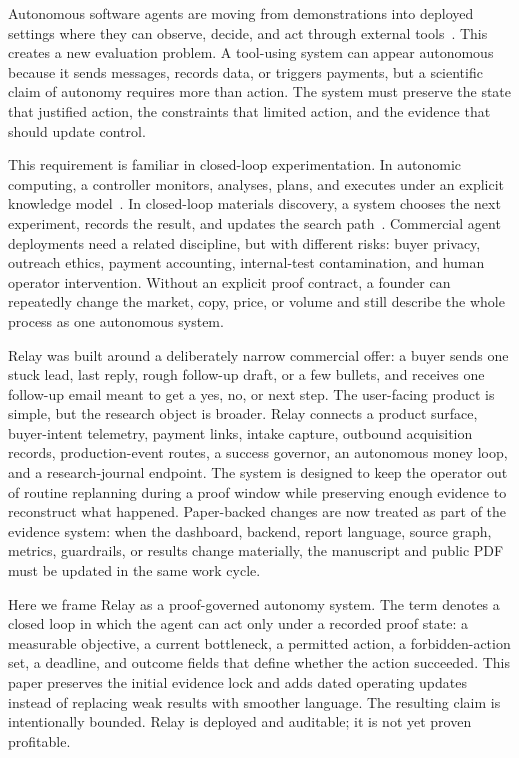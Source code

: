 \documentclass[12pt,letterpaper]{article}
\begin{document}
Autonomous software agents are moving from demonstrations into deployed settings where they can observe, decide, and act through external tools~\cite{yao_react_2023,schick_toolformer_2023,park_generative_2023,wu_autogen_2023,wang_survey_2023}. This creates a new evaluation problem. A tool-using system can appear autonomous because it sends messages, records data, or triggers payments, but a scientific claim of autonomy requires more than action. The system must preserve the state that justified action, the constraints that limited action, and the evidence that should update control.

This requirement is familiar in closed-loop experimentation. In autonomic computing, a controller monitors, analyses, plans, and executes under an explicit knowledge model~\cite{kephart_vision_2003}. In closed-loop materials discovery, a system chooses the next experiment, records the result, and updates the search path~\cite{kusne_closed_loop_2020}. Commercial agent deployments need a related discipline, but with different risks: buyer privacy, outreach ethics, payment accounting, internal-test contamination, and human operator intervention. Without an explicit proof contract, a founder can repeatedly change the market, copy, price, or volume and still describe the whole process as one autonomous system.

Relay was built around a deliberately narrow commercial offer: a buyer sends one stuck lead, last reply, rough follow-up draft, or a few bullets, and receives one follow-up email meant to get a yes, no, or next step. The user-facing product is simple, but the research object is broader. Relay connects a product surface, buyer-intent telemetry, payment links, intake capture, outbound acquisition records, production-event routes, a success governor, an autonomous money loop, and a research-journal endpoint. The system is designed to keep the operator out of routine replanning during a proof window while preserving enough evidence to reconstruct what happened. Paper-backed changes are now treated as part of the evidence system: when the dashboard, backend, report language, source graph, metrics, guardrails, or results change materially, the manuscript and public PDF must be updated in the same work cycle.

Here we frame Relay as a proof-governed autonomy system. The term denotes a closed loop in which the agent can act only under a recorded proof state: a measurable objective, a current bottleneck, a permitted action, a forbidden-action set, a deadline, and outcome fields that define whether the action succeeded. This paper preserves the initial evidence lock and adds dated operating updates instead of replacing weak results with smoother language. The resulting claim is intentionally bounded. Relay is deployed and auditable; it is not yet proven profitable.
\end{document}

